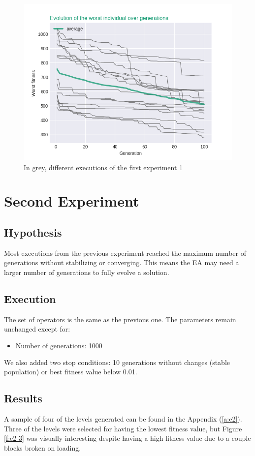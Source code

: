 \begin{figure}[H]
	\centering
	\includegraphics[scale=0.55]{gfx/exp1_worstIndv.png}
	\caption{In grey, different executions of the first experiment 1}\label{f:grahp1}
\end{figure}

\section{Second Experiment}
\subsection{Hypothesis}
Most executions from the previous experiment reached the maximum number of generations without stabilizing or converging. This means the \acs{EA} may need a larger number of generations to fully evolve a solution. 
\subsection{Execution}
The set of operators is the same as the previous one. The parameters remain unchanged except for:
\begin{itemize}
	\item Number of generations: 1000
\end{itemize}
We also added two stop conditions: 10 generations without changes (stable population) or best fitness value below 0.01.
\subsection{Results}
A sample of four of the levels generated can be found in the Appendix (\ref{a:e2}). Three of the levels were selected for having the lowest fitness value, but Figure \ref{f:e2-3} was visually interesting despite having a high fitness value due to a couple blocks broken on loading. 

